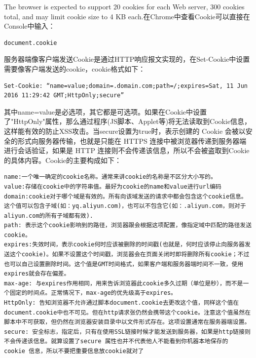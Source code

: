 \documentclass[letter]{book}
\begin{document}
The browser is expected to support 20 cookies for each Web server, 300 cookies total, and may limit cookie size to 4 KB each.在Chrome中查看Cookie可以直接在Console中输入：

\begin{lstlisting}[language=Bash]
document.cookie
\end{lstlisting}

服务器端像客户端发送Cookie是通过HTTP响应报文实现的，在Set-Cookie中设置需要像客户端发送的cookie，cookie格式如下：

\begin{lstlisting}
Set-Cookie: “name=value;domain=.domain.com;path=/;expires=Sat, 11 Jun 2016 11:29:42 GMT;HttpOnly;secure”
\end{lstlisting}

其中name=value是必选项，其它都是可选项。如果在Cookie中设置了"HttpOnly"属性，那么通过程序(JS脚本、Applet等)将无法读取到Cookie信息，这样能有效的防止XSS攻击。当secure设置为true时，表示创建的 Cookie 会被以安全的形式向服务器传输，也就是只能在 HTTPS 连接中被浏览器传递到服务器端进行会话验证，如果是 HTTP 连接则不会传递该信息，所以不会被盗取到Cookie 的具体内容。Cookie的主要构成如下：

\begin{lstlisting}
name:一个唯一确定的cookie名称。通常来讲cookie的名称是不区分大小写的。
value:存储在cookie中的字符串值。最好为cookie的name和value进行url编码
domain:cookie对于哪个域是有效的。所有向该域发送的请求中都会包含这个cookie信息。这个值可以包含子域(如：yq.aliyun.com)，也可以不包含它(如：.aliyun.com，则对于aliyun.com的所有子域都有效).
path: 表示这个cookie影响到的路径，浏览器跟会根据这项配置，像指定域中匹配的路径发送cookie。
expires:失效时间，表示cookie何时应该被删除的时间戳(也就是，何时应该停止向服务器发送这个cookie)。如果不设置这个时间戳，浏览器会在页面关闭时即将删除所有cookie；不过也可以自己设置删除时间。这个值是GMT时间格式，如果客户端和服务器端时间不一致，使用expires就会存在偏差。
max-age: 与expires作用相同，用来告诉浏览器此cookie多久过期（单位是秒），而不是一个固定的时间点。正常情况下，max-age的优先级高于expires。
HttpOnly: 告知浏览器不允许通过脚本document.cookie去更改这个值，同样这个值在document.cookie中也不可见。但在http请求张仍然会携带这个cookie。注意这个值虽然在脚本中不可获取，但仍然在浏览器安装目录中以文件形式存在。这项设置通常在服务器端设置。
secure: 安全标志，指定后，只有在使用SSL链接时候才能发送到服务器，如果是http链接则不会传递该信息。就算设置了secure 属性也并不代表他人不能看到你机器本地保存的 cookie 信息，所以不要把重要信息放cookie就对了
\end{lstlisting}
\end{document}
